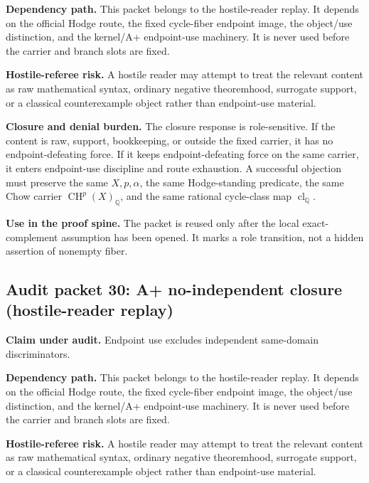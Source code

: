 \documentclass[11pt]{article}
\newcommand{\QQ}{\mathbb{Q}}
\newcommand{\CH}{\operatorname{CH}}
\newcommand{\clQ}{\operatorname{cl}_{\QQ}}
\begin{document}
\par\noindent\textbf{Dependency path.} This packet belongs to the hostile-reader replay. It depends on the official Hodge route, the fixed cycle-fiber endpoint image, the object/use distinction, and the kernel/A+ endpoint-use machinery. It is never used before the carrier and branch slots are fixed.


\par\noindent\textbf{Hostile-referee risk.} A hostile reader may attempt to treat the relevant content as raw mathematical syntax, ordinary negative theoremhood, surrogate support, or a classical counterexample object rather than endpoint-use material.


\par\noindent\textbf{Closure and denial burden.} The closure response is role-sensitive. If the content is raw, support, bookkeeping, or outside the fixed carrier, it has no endpoint-defeating force. If it keeps endpoint-defeating force on the same carrier, it enters endpoint-use discipline and route exhaustion. A successful objection must preserve the same $X,p,\alpha$, the same Hodge-standing predicate, the same Chow carrier $\CH^p(X)_\QQ$, and the same rational cycle-class map $\clQ$.


\par\noindent\textbf{Use in the proof spine.} The packet is reused only after the local exact-complement assumption has been opened. It marks a role transition, not a hidden assertion of nonempty fiber.


\subsection{Audit packet 30: A+ no-independent closure (hostile-reader replay)}


\par\noindent\textbf{Claim under audit.} Endpoint use excludes independent same-domain discriminators.


\par\noindent\textbf{Dependency path.} This packet belongs to the hostile-reader replay. It depends on the official Hodge route, the fixed cycle-fiber endpoint image, the object/use distinction, and the kernel/A+ endpoint-use machinery. It is never used before the carrier and branch slots are fixed.


\par\noindent\textbf{Hostile-referee risk.} A hostile reader may attempt to treat the relevant content as raw mathematical syntax, ordinary negative theoremhood, surrogate support, or a classical counterexample object rather than endpoint-use material.
\end{document}
